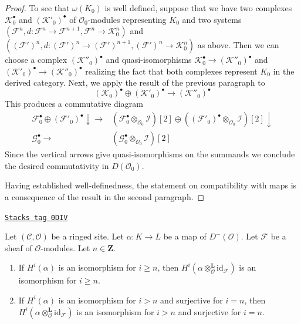 \begin{proof}
\medskip\noindent
To see that $\omega(K_0)$ is well defined, suppose that we have two complexes
$\mathcal{K}_0^\bullet$ and $(\mathcal{K}'_0)^\bullet$
of $\mathcal{O}_0$-modules representing $K_0$ and two systems
$(\mathcal{F}^n, d : \mathcal{F}^n \to \mathcal{F}^{n + 1},
\mathcal{F}^n \to \mathcal{K}_0^n)$
and
$((\mathcal{F}')^n, d : (\mathcal{F}')^n \to (\mathcal{F}')^{n + 1},
(\mathcal{F}')^n \to \mathcal{K}_0^n)$
as above. Then we can choose a complex $(\mathcal{K}''_0)^\bullet$
and quasi-isomorphisms
$\mathcal{K}_0^\bullet  \to (\mathcal{K}''_0)^\bullet$
and
$(\mathcal{K}'_0)^\bullet  \to (\mathcal{K}''_0)^\bullet$
realizing the fact that both complexes represent $K_0$ in the
derived category. Next, we apply the result of the previous paragraph
to
$$
(\mathcal{K}_0)^\bullet \oplus (\mathcal{K}'_0)^\bullet
\longrightarrow
(\mathcal{K}''_0)^\bullet
$$
This produces a commutative diagram
$$
\begin{array}{cc}\mathcal{F}_0^\bullet \oplus (\mathcal{F}'_0)^\bullet
\downarrow\longrightarrow & (\mathcal{F}_0^\bullet \otimes_{\mathcal{O}_0} \mathcal{I})[2] \oplus
((\mathcal{F}'_0)^\bullet \otimes_{\mathcal{O}_0} \mathcal{I})[2] \downarrow \\ \mathcal{G}_0^\bullet \longrightarrow & (\mathcal{G}_0^\bullet \otimes_{\mathcal{O}_0} \mathcal{I})[2]\end{array}
$$
Since the vertical arrows give quasi-isomorphisms on the summands
we conclude the desired commutativity in $D(\mathcal{O}_0)$.

\medskip\noindent
Having established well-definedness, the statement on compatibility
with maps is a consequence of the result in the second
paragraph.
\end{proof}

\begin{lemma}
\label{defos-lemma-induced-map}
\href{https://stacks.math.columbia.edu/tag/0DIV}{\texttt{Stacks tag 0DIV}}

Let $(\mathcal{C}, \mathcal{O})$ be a ringed site.
Let $\alpha : K \to L$ be a map of $D^-(\mathcal{O})$.
Let $\mathcal{F}$ be a sheaf of $\mathcal{O}$-modules.
Let $n \in \mathbf{Z}$.
\begin{enumerate}
\item If $H^i(\alpha)$ is an isomorphism for $i \geq n$,
then $H^i(\alpha \otimes_\mathcal{O}^\mathbf{L} \text{id}_\mathcal{F})$
is an isomorphism for $i \geq n$.
\item If $H^i(\alpha)$ is an isomorphism for $i > n$
and surjective for $i = n$,
then $H^i(\alpha \otimes_\mathcal{O}^\mathbf{L} \text{id}_\mathcal{F})$
is an isomorphism for $i > n$ and surjective for $i = n$.
\end{enumerate}
\end{lemma}

